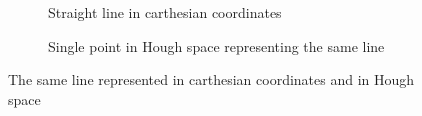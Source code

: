 \documentclass[a4paper, 12pt]{article}
\begin{document}
\begin{figure}[h]
\centering
\begin{subfigure}[b]{0.4\textwidth}
\fboxsep=0.5mm
\caption{Straight line in carthesian coordinates}
\end{subfigure}
\quad
\begin{subfigure}[b]{0.4\textwidth}
\fboxsep=0.5mm
\caption{Single point in Hough space representing the same line}
\end{subfigure}
\caption{The same line represented in carthesian coordinates and in Hough space}
\label{fig:cathesian_hough}
\end{figure}
\end{document}
